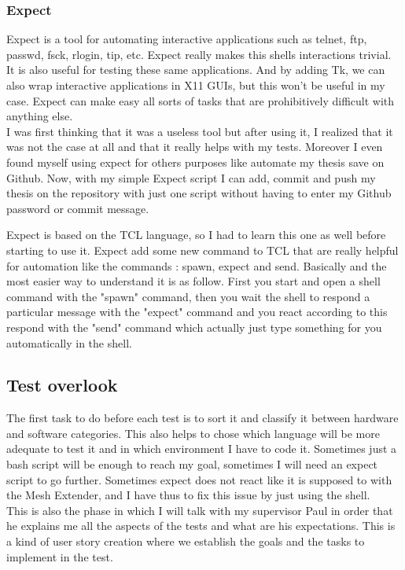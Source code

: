 \subsubsection{Expect}
Expect is a tool for automating interactive applications such as telnet, ftp, passwd, fsck, rlogin, tip, etc. Expect really makes this shells interactions trivial. It is also useful for testing these same applications. And by adding Tk, we can also wrap interactive applications in X11 GUIs, but this won't be useful in my case. Expect can make easy all sorts of tasks that are prohibitively difficult with anything else.\\
I was first thinking that it was a useless tool but after using it, I realized that it was not the case at all and that it really helps with my tests. Moreover I even found myself using expect for others purposes like automate my thesis save on Github. Now, with my simple Expect script I can add, commit and push my thesis on the repository with just one script without having to enter my Github password or commit message. 
\par
Expect is based on the TCL language, so I had to learn this one as well before starting to use it. Expect add some new command to TCL that are really helpful for automation like the commands : spawn, expect and send. Basically and the most easier way to understand it is as follow. First you start and open a shell command with the "spawn" command, then you wait the shell to respond a particular message with the "expect" command and you react according to this respond with the "send" command which actually just type something for you automatically in the shell. 

\subsection{Test overlook} 
The first task to do before each test is to sort it and classify it between hardware and software categories. This also helps to chose which language will be more adequate to test it and in which environment I have to code it. Sometimes just a bash script will be enough to reach my goal, sometimes I will need an expect script to go further. Sometimes expect does not react like it is supposed to with the Mesh Extender, and I have thus to fix this issue by just using the shell. \\
This is also the phase in which I will talk with my supervisor Paul in order that he explains me all the aspects of the tests and what are his expectations. This is a kind of user story creation where we establish the goals and the tasks to implement in the test.

